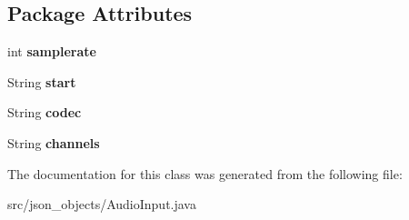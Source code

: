 \subsection*{Package Attributes}
\begin{DoxyCompactItemize}
\item 
\hypertarget{classjson__objects_1_1_audio_input_abd4778f37bcb4fdceeb5d78115e09e3d}{
int {\bfseries samplerate}}
\label{classjson__objects_1_1_audio_input_abd4778f37bcb4fdceeb5d78115e09e3d}

\item 
\hypertarget{classjson__objects_1_1_audio_input_a023cdeb9342c5617a97965400c8eb441}{
String {\bfseries start}}
\label{classjson__objects_1_1_audio_input_a023cdeb9342c5617a97965400c8eb441}

\item 
\hypertarget{classjson__objects_1_1_audio_input_a3abd5799143386b4beffa40c0943db5e}{
String {\bfseries codec}}
\label{classjson__objects_1_1_audio_input_a3abd5799143386b4beffa40c0943db5e}

\item 
\hypertarget{classjson__objects_1_1_audio_input_a20a7c96b30562356a03e81b521df73c8}{
String {\bfseries channels}}
\label{classjson__objects_1_1_audio_input_a20a7c96b30562356a03e81b521df73c8}

\end{DoxyCompactItemize}


The documentation for this class was generated from the following file:\begin{DoxyCompactItemize}
\item 
src/json\_\-objects/AudioInput.java\end{DoxyCompactItemize}
